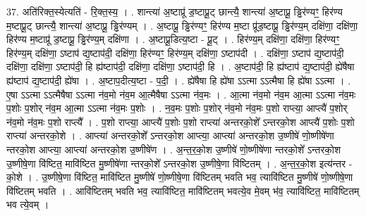 \documentclass[17pt]{extarticle}
\begin{document}
37. अति॑रिक्त॒स्येत्यति॑ - रि॒क्त॒स्य॒ । . शान्त्या॑ अ॒ष्टाप्रू॑ ड॒ष्टाप्रू॒ट् छान्त्यै॒ शान्त्या॑ अ॒ष्टाप्रू॒ ड्ढिर॑ण्यꣳ॒॒ हिर॑ण्य म॒ष्टाप्रू॒ट् छान्त्यै॒ शान्त्या॑ अ॒ष्टाप्रू॒ ड्ढिर॑ण्यम् । . अ॒ष्टाप्रू॒ ड्ढिर॑ण्यꣳ॒॒ हिर॑ण्य म॒ष्टा प्रू॑ड॒ष्टाप्रू॒ ड्ढिर॑ण्य॒म् दक्षि॑णा॒ दक्षि॑णा॒ हिर॑ण्य म॒ष्टाप्रू॑ ड॒ष्टाप्रू॒ ड्ढिर॑ण्य॒म् दक्षि॑णा । . अ॒ष्टाप्रू॒डित्य॒ष्टा - प्रू॒ट् । . हिर॑ण्य॒म् दक्षि॑णा॒ दक्षि॑णा॒ हिर॑ण्यꣳ॒॒ हिर॑ण्य॒म् दक्षि॑णा॒ ऽष्टाप॑ द्य॒ष्टाप॑दी॒ दक्षि॑णा॒ हिर॑ण्यꣳ॒॒ हिर॑ण्य॒म् दक्षि॑णा॒ ऽष्टाप॑दी । . दक्षि॑णा॒ ऽष्टाप॑ द्य॒ष्टाप॑दी॒ दक्षि॑णा॒ दक्षि॑णा॒ ऽष्टाप॑दी॒ हि ह्य॑ष्टाप॑दी॒ दक्षि॑णा॒ दक्षि॑णा॒ ऽष्टाप॑दी॒ हि । . अ॒ष्टाप॑दी॒ हि ह्य॑ष्टाप॑ द्य॒ष्टाप॑दी॒ ह्ये॑षैषा ह्य॑ष्टाप॑ द्य॒ष्टाप॑दी॒ ह्ये॑षा । . अ॒ष्टाप॒दीत्य॒ष्टा - प॒दी॒ । . ह्ये॑षैषा हि ह्ये॑षा ऽऽत्मा ऽऽत्मैषा हि ह्ये॑षा ऽऽत्मा । . ए॒षा ऽऽत्मा ऽऽत्मैषैषा ऽऽत्मा न॑व॒मो न॑व॒म आ॒त्मैषैषा ऽऽत्मा न॑व॒मः । . आ॒त्मा न॑व॒मो न॑व॒म आ॒त्मा ऽऽत्मा न॑व॒मः प॒शोः प॒शोर् न॑व॒म आ॒त्मा ऽऽत्मा न॑व॒मः प॒शोः । . न॒व॒मः प॒शोः प॒शोर् न॑व॒मो न॑व॒मः प॒शो राप्त्या॒ आप्त्यै॑ प॒शोर् न॑व॒मो न॑व॒मः प॒शो राप्त्यै᳚ । . प॒शो राप्त्या॒ आप्त्यै॑ प॒शोः प॒शो राप्त्या॑ अन्तरको॒शे᳚ ऽन्तरको॒श आप्त्यै॑ प॒शोः प॒शो राप्त्या॑ अन्तरको॒शे । . आप्त्या॑ अन्तरको॒शे᳚ ऽन्तरको॒श आप्त्या॒ आप्त्या॑ अन्तरको॒श उ॒ष्णीषे॑ णो॒ष्णीषे॑णा न्तरको॒श आप्त्या॒ आप्त्या॑ अन्तरको॒श उ॒ष्णीषे॑ण । . अ॒न्त॒र॒को॒श उ॒ष्णीषे॑ णो॒ष्णीषे॑णा न्तरको॒शे᳚ ऽन्तरको॒श उ॒ष्णीषे॒णा वि॑ष्टित॒ मावि॑ष्टित मु॒ष्णीषे॑णा न्तरको॒शे᳚ ऽन्तरको॒श उ॒ष्णीषे॒णा वि॑ष्टितम् । . अ॒न्त॒र॒को॒श इत्य॑न्तर - को॒शे । . उ॒ष्णीषे॒णा वि॑ष्टित॒ मावि॑ष्टित मु॒ष्णीषे॑ णो॒ष्णीषे॒णा वि॑ष्टितम् भवति भव॒ त्यावि॑ष्टित मु॒ष्णीषे॑ णो॒ष्णीषे॒णा वि॑ष्टितम् भवति । . आवि॑ष्टितम् भवति भव॒ त्यावि॑ष्टित॒ मावि॑ष्टितम् भवत्ये॒व मे॒वम् भ॑व॒ त्यावि॑ष्टित॒ मावि॑ष्टितम् भव त्ये॒वम् । \newline
\end{document}
